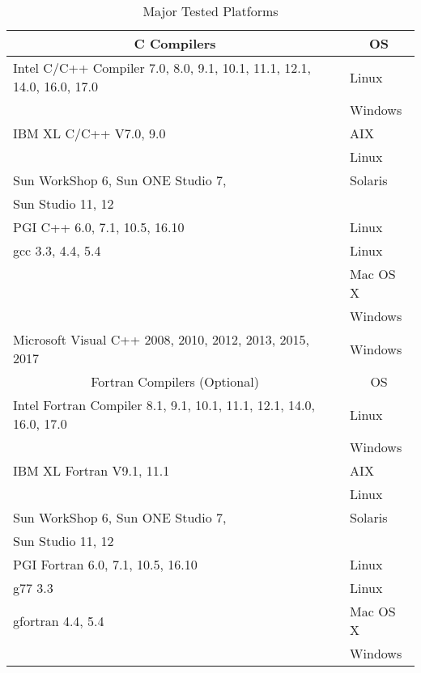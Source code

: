 \documentclass[a4paper]{article}
\begin{document}
\begin{table}[htbp]
\caption{Major Tested Platforms}
\label{platforms}
\begin{center}
{\small
 \begin{tabular}{l|l}
\hline
\multicolumn{1}{c|}{C Compilers} & \multicolumn{1}{c}{OS} \\
\hline
Intel C/C++ Compiler 7.0, 8.0, 9.1, 10.1, 11.1, 12.1, 14.0, 16.0, 17.0 & Linux \\
                                                     & Windows  \\
\hline
IBM XL C/C++ V7.0, 9.0                     & AIX     \\
                                           & Linux   \\
\hline
Sun WorkShop 6, Sun ONE Studio 7,          & Solaris \\
Sun Studio 11, 12                          &         \\
\hline
PGI C++ 6.0, 7.1, 10.5, 16.10              & Linux \\
\hline
gcc 3.3, 4.4, 5.4                          & Linux \\
                                           & Mac OS X \\
                                           & Windows \\
\hline
Microsoft Visual C++ 2008, 2010, 2012, 2013, 2015, 2017       & Windows \\
\hline
\hline
\multicolumn{1}{c|}{Fortran Compilers (Optional)} & \multicolumn{1}{c}{OS} \\
\hline
Intel Fortran Compiler 8.1, 9.1, 10.1, 11.1, 12.1, 14.0, 16.0, 17.0 & Linux \\
                                                  & Windows  \\
\hline
IBM XL Fortran V9.1, 11.1                  & AIX     \\
                                           & Linux   \\
\hline
Sun WorkShop 6, Sun ONE Studio 7,          & Solaris \\
Sun Studio 11, 12                          &         \\
\hline
PGI Fortran 6.0, 7.1, 10.5, 16.10          & Linux \\
\hline
g77 3.3                                    & Linux \\
gfortran 4.4, 5.4                          & Mac OS X \\
                                           & Windows \\
\hline
\end{tabular}
}
\end{center}
\end{table} 
\end{document}
